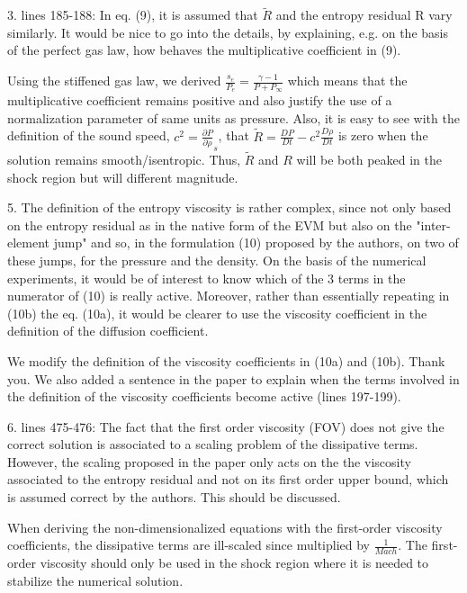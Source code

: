 \documentclass{article}
\begin{document}
{
\color{blue}
3. lines 185-188: In eq. (9), it is assumed that $\tilde{R}$ and the entropy residual R vary similarly. It would be nice to go into the details, by explaining, e.g. on the basis of the perfect gas law, how behaves the multiplicative coefficient in (9). 
}

Using the stiffened gas law, we derived $\frac{s_e}{P_e} = \frac{\gamma-1}{P+P_\infty}$ which means that the multiplicative coefficient remains positive and also justify the use of a normalization parameter of same units as pressure. Also, it is easy to see with the definition of the sound speed, $c^2 = \frac{\partial P}{\partial \rho}_s$, that $\tilde{R} = \frac{DP}{Dt}-c^2 \frac{D\rho}{Dt}$ is zero when the solution remains smooth/isentropic. Thus, $\tilde{R}$ and $R$ will be both peaked in the shock region but will different magnitude.
\bigskip


{
\color{blue}
5. The definition of the entropy viscosity is rather complex, since not only based on  the entropy residual as in the native form of the EVM but also on  the "inter-element jump" and so, in the formulation (10) proposed by the authors, on two of these jumps, for the pressure and the density. On the basis of the numerical experiments, it  would be of interest to know which of the 3 terms in the numerator of (10) is really active.  Moreover, rather than essentially repeating in (10b) the eq. (10a), it would be clearer to use the viscosity coefficient in the definition of the diffusion coefficient.
}

We modify the definition of the viscosity coefficients in (10a) and (10b). Thank you. We also added a sentence in the paper to explain when the terms involved in the definition of the viscosity coefficients become active (lines 197-199).
\bigskip


{
\color{blue}
6. lines 475-476: The fact that the first order viscosity (FOV)  does not give the correct solution is associated to a scaling problem of the dissipative terms. However, the scaling proposed in the paper only acts on the the viscosity associated to the entropy residual and not on its first order upper bound, which is assumed correct by the authors. This should be discussed.
}

When deriving the non-dimensionalized equations with the first-order viscosity coefficients, the dissipative terms are ill-scaled since multiplied by $\frac{1}{Mach}$. The first-order viscosity should only be used in the shock region where it is needed to stabilize the numerical solution. 
\bigskip
\end{document}
